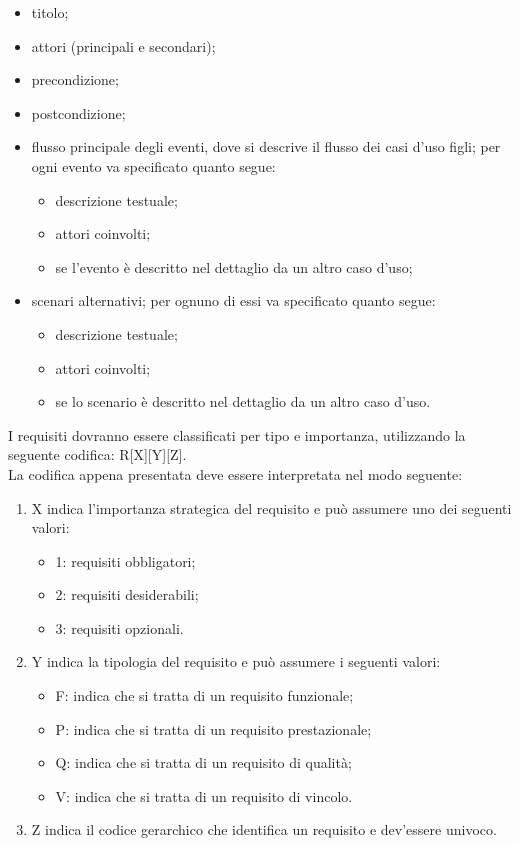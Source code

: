 			\begin{itemize}
				\item titolo;
				\item attori (principali e secondari);
				\item precondizione;
				\item postcondizione;
				\item flusso principale degli eventi, dove si descrive il flusso dei casi d'uso figli; per ogni evento va specificato quanto segue:
				\begin{itemize}
					\item descrizione testuale;
					\item attori coinvolti;
					\item se l’evento è descritto nel dettaglio da un altro caso d’uso;
				\end{itemize}
				\item scenari alternativi; per ognuno di essi va specificato quanto segue:
				\begin{itemize}
					\item descrizione testuale;
					\item attori coinvolti;
					\item se lo scenario è descritto nel dettaglio da un altro caso d’uso.
				\end{itemize}
			\end{itemize}
			I requisiti dovranno essere classificati per tipo e importanza, utilizzando la seguente codifica: R[X][Y][Z].\\
			La codifica appena presentata deve essere interpretata nel modo seguente:
			\begin{enumerate}
				\item X indica l'importanza strategica del requisito e può assumere uno dei seguenti valori:
				\begin{itemize}
					\item 1: requisiti obbligatori;
					\item 2: requisiti desiderabili;
					\item 3: requisiti opzionali.
				\end{itemize}
				\item Y indica la tipologia del requisito e può assumere i seguenti valori:
				\begin{itemize}
					\item F: indica che si tratta di un requisito funzionale;
					\item P: indica che si tratta di un requisito prestazionale;
					\item Q: indica che si tratta di un requisito di qualità;
					\item V: indica che si tratta di un requisito di vincolo.
				\end{itemize}
				\item Z indica il codice gerarchico che identifica un requisito e dev'essere univoco.
			\end{enumerate}

